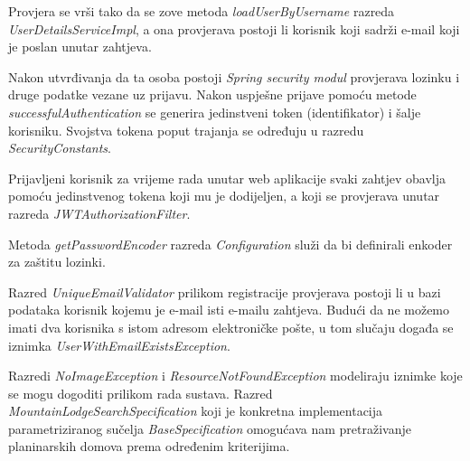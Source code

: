 			 Provjera se vrši tako da se zove metoda \textit{loadUserByUsername} razreda \textit{UserDetailsServiceImpl}, a ona provjerava postoji li korisnik koji sadrži e-mail koji je poslan unutar zahtjeva. 
			 
			 Nakon utvrđivanja da ta osoba postoji \textit{Spring security modul} provjerava lozinku i druge podatke vezane uz prijavu. Nakon uspješne prijave pomoću metode \textit{successfulAuthentication} se generira jedinstveni token (identifikator) i šalje korisniku. Svojstva tokena poput trajanja se određuju u razredu \textit{SecurityConstants}. 
			
			Prijavljeni korisnik za vrijeme rada unutar web aplikacije svaki zahtjev obavlja pomoću jedinstvenog tokena koji mu je dodijeljen, a koji se provjerava unutar razreda \textit{JWTAuthorizationFilter}. 
			
			Metoda \textit{getPasswordEncoder} razreda \textit{Configuration} služi da bi definirali enkoder za zaštitu lozinki. 
			
			Razred \textit{UniqueEmailValidator} prilikom registracije provjerava postoji li u bazi podataka korisnik kojemu je e-mail isti e-mailu zahtjeva. Budući da ne možemo imati dva korisnika s istom adresom elektroničke pošte, u tom slučaju događa se iznimka \textit{UserWithEmailExistsException}.  
			
			Razredi \textit{NoImageException} i \textit{ResourceNotFoundException} modeliraju iznimke koje se mogu dogoditi prilikom rada sustava.
			Razred \textit{MountainLodgeSearchSpecification} koji je konkretna implementacija parametriziranog sučelja \textit{BaseSpecification} omogućava nam pretraživanje planinarskih domova prema određenim kriterijima.
			
